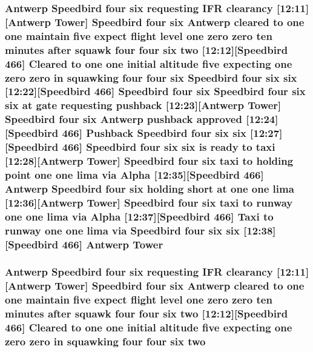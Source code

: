 \subsubsection[{\texorpdfstring{Tower}{Tower}}]{\setlength{\rightskip}{0pt plus 5cm}Antwerp Speedbird four {\bf six} requesting I\+FR clearancy \mbox{[}12\+:11\mbox{]}\mbox{[}Antwerp Tower\mbox{]} Speedbird four {\bf six} Antwerp cleared to {\bf one} {\bf one} maintain five expect flight level {\bf one} {\bf zero} {\bf zero} {\bf ten} minutes after squawk four four {\bf six} {\bf two} \mbox{[}12\+:12\mbox{]}\mbox{[}Speedbird 466\mbox{]} Cleared to {\bf one} {\bf one} initial altitude five expecting {\bf one} {\bf zero} {\bf zero} in {\bf squawking} four four {\bf six} Speedbird four {\bf six} {\bf six} \mbox{[}12\+:22\mbox{]}\mbox{[}Speedbird 466\mbox{]} Speedbird four {\bf six} Speedbird four {\bf six} {\bf six} at gate requesting pushback \mbox{[}12\+:23\mbox{]}\mbox{[}Antwerp Tower\mbox{]} Speedbird four {\bf six} Antwerp pushback {\bf approved} \mbox{[}12\+:24\mbox{]}\mbox{[}Speedbird 466\mbox{]} Pushback Speedbird four {\bf six} {\bf six} \mbox{[}12\+:27\mbox{]}\mbox{[}Speedbird 466\mbox{]} Speedbird four {\bf six} {\bf six} is ready to taxi \mbox{[}12\+:28\mbox{]}\mbox{[}Antwerp Tower\mbox{]} Speedbird four {\bf six} taxi to holding point {\bf one} {\bf one} {\bf lima} via {\bf Alpha} \mbox{[}12\+:35\mbox{]}\mbox{[}Speedbird 466\mbox{]} Antwerp Speedbird four {\bf six} holding short at {\bf one} {\bf one} {\bf lima} \mbox{[}12\+:36\mbox{]}\mbox{[}Antwerp Tower\mbox{]} Speedbird four {\bf six} taxi to runway {\bf one} {\bf one} {\bf lima} via {\bf Alpha} \mbox{[}12\+:37\mbox{]}\mbox{[}Speedbird 466\mbox{]} Taxi to runway {\bf one} {\bf one} {\bf lima} via Speedbird four {\bf six} {\bf six} \mbox{[}12\+:38\mbox{]}\mbox{[}Speedbird 466\mbox{]} Antwerp Tower}\hypertarget{ATC_8txt_a82e4fe311db1d84af6e8e53fd0d1025d}{}\label{ATC_8txt_a82e4fe311db1d84af6e8e53fd0d1025d}
\subsubsection[{\texorpdfstring{two}{two}}]{\setlength{\rightskip}{0pt plus 5cm}Antwerp Speedbird four {\bf six} requesting I\+FR clearancy \mbox{[}12\+:11\mbox{]}\mbox{[}Antwerp {\bf Tower}\mbox{]} Speedbird four {\bf six} Antwerp cleared to {\bf one} {\bf one} maintain five expect flight level {\bf one} {\bf zero} {\bf zero} {\bf ten} minutes after squawk four four {\bf six} two \mbox{[}12\+:12\mbox{]}\mbox{[}Speedbird 466\mbox{]} Cleared to {\bf one} {\bf one} initial altitude five expecting {\bf one} {\bf zero} {\bf zero} in {\bf squawking} four four {\bf six} two}\hypertarget{ATC_8txt_acefcb7c39c96f311e277d8ea7ca18a6a}{}\label{ATC_8txt_acefcb7c39c96f311e277d8ea7ca18a6a}
